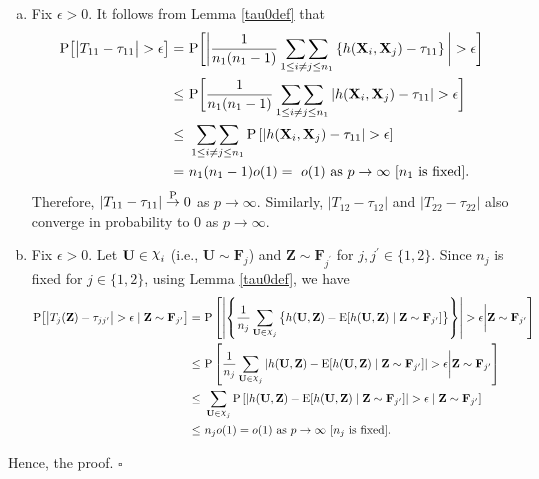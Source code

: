 \documentclass[twoside]{article}
\newcommand{\bX}{\mathbf{X}}
\newcommand{\bZ}{\mathbf{Z}}
\newcommand{\bF}{\mathbf{F}}
\newcommand{\bU}{\mathbf{U}}
\newcommand{\0}{\mathbf{0}}
\newcommand{\1}{\mathbf{1}}
\newcommand*{\QEDB}{\hfill\ensuremath{\square}}
\DeclareRobustCommand{\rchi}{{\mathpalette\irchi\relax}}
\newcommand{\irchi}[2]{\raisebox{\depth}{$#1\chi$}} %
\numberwithin{equation}{section}
\begin{document}
\begin{enumerate}[(a)]
 \item Fix $\epsilon>0$. It follows from Lemma \ref{tau0def} that
\begin{align}\label{ref1}
{\rm P}\big [\big |T_{11} - \tau_{11}\big |>\epsilon\big ]
= &\ {\rm P} \bigg [\bigg |\frac{1}{n_1(n_1-1)}\mathop{\sum\sum}\limits_{1\leq i\neq j\leq n_1}\left\{{h}(\bX_{i},\bX_{j})-\tau_{11}\right\}\bigg |>\epsilon \bigg]\nonumber\\
\leq &\ {\rm P} \bigg [\frac{1}{n_1(n_1-1)}\mathop{\sum\sum}\limits_{1\leq i\neq j\leq n_1}\left |{h}(\bX_{i},\bX_{j}) -\tau_{11}\right |>\epsilon \bigg]\nonumber \\
\leq &\ \mathop{\sum\sum}\limits_{1\leq i\neq j\leq n_1}{\rm P} \left [\left |{h}(\bX_{i},\bX_{j}) -\tau_{11}\right |>\epsilon \right]\nonumber\\
=&\ n_1(n_1-1)o(1)=\ o(1)\text{ as }p\to\infty\ [\text{$n_1$ is fixed}].
\end{align}
Therefore, $|T_{11}-\tau_{11}|\stackrel{\rm P}{\to}0$ as $p\to\infty$. Similarly, $|T_{12}-\tau_{12}|$ and $|T_{22}-\tau_{22}|$ also converge in probability to 0 as $p\to\infty$.
\item Fix $\epsilon>0$. Let $\bU\in\rchi_i$ (i.e., $\bU\sim\bF_j$) and $\bZ\sim\bF_{j^\prime}$ for $j,j^\prime\in\{1,2\}$. Since $n_j$ is fixed for $j\in\{1,2\}$, using Lemma \ref{tau0def}, we have
\begin{align}\label{ref3}
{\rm P}\big [\big |T_{j}(\bZ) - \tau_{jj^\prime}\big |>\epsilon\mid\bZ\sim\bF_{j^\prime}\big ]
=&\  {\rm P}\left [\left |\left \{\frac{1}{n_j}\sum_{\bU\in\rchi_j}\big \{h(\bU,\bZ) - {\rm E}[h(\bU,\bZ)\mid\bZ\sim\bF_{j^\prime}]\big \}\right \}\right |>\epsilon\bigg |\bZ\sim\bF_{j^\prime} \right ]\nonumber\\
\leq &\ {\rm P}\left [\frac{1}{n_j}\sum_{\bU\in\rchi_j}\left |h(\bU,\bZ) - {\rm E}[h(\bU,\bZ)\mid\bZ\sim\bF_{j^\prime}]\right |>\epsilon \bigg |\bZ\sim\bF_{j^\prime}\right ]\nonumber \\
\leq &\ \sum_{\bU\in\rchi_j}{\rm P}\left [\left |h(\bU,\bZ) - {\rm E}[h(\bU,\bZ)\mid\bZ\sim\bF_{j^\prime}]\right |>\epsilon \mid\bZ\sim\bF_{j^\prime}\right ]\nonumber \\
\leq &\ n_jo(1)=o(1)\text{ as }p\to\infty\ [ n_j\text{ is fixed].}
\end{align}
\end{enumerate}
Hence, the proof. \hfill \QEDB\newline
\end{document}
